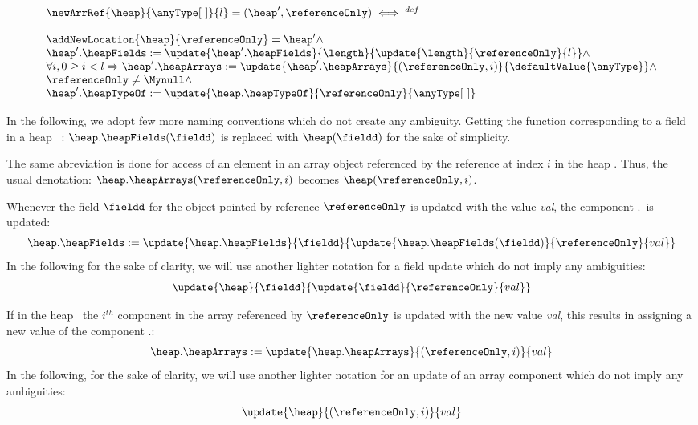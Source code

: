  $$  \begin{array}{l}
            \newArrRef{\heap}{\anyType\lbrack \ \rbrack}{l} = (\heap', \referenceOnly)      \iff^{def} \\
	    \\
	    \addNewLocation{\heap}{\referenceOnly} = \heap' \wedge \\
            \heap'.\heapFields :=  \update{\heap'.\heapFields}{\length}{\update{\length}{ \referenceOnly}{ l }} \wedge  \\
	    \forall i, 0 \geq i < l  \Rightarrow   \heap'.\heapArrays :=
            \update{\heap'.\heapArrays}{(\referenceOnly , i)}{ \defaultValue{\anyType }  } \wedge \\ 
	    \referenceOnly \neq \Mynull \wedge \\ 
	    \heap'.\heapTypeOf :=  \update{ \heap.\heapTypeOf}{ \referenceOnly}{\anyType\lbrack \ \rbrack  }    
     \end{array} $$



In the following, we adopt few more naming conventions which do not create any ambiguity.
 Getting the function corresponding to a field \fieldd in a heap \heap \ :
$ \heap . \heapFields ( \fieldd)$ is replaced  with $ \heap  ( \fieldd)$ for the sake of simplicity.
 
The same abreviation is done for access of an element in an  array object referenced by the reference 
  at index $i$ in the heap \heap. Thus, the usual denotation:
$ \heap . \heapArrays (\referenceOnly, i )$ becomes $ \heap(\referenceOnly, i )$.
 
 




 
   Whenever the  field $\fieldd$ for the object pointed by reference
 $\referenceOnly$ is updated  with the value \textit{val},
 the component \heap.\heapFields \ is updated:
 $$ \heap.\heapFields := \update{\heap.\heapFields}{\fieldd}{\update{\heap.\heapFields(\fieldd)}{\referenceOnly}{val}} $$  
 In the following for the sake of clarity, we will use another lighter notation for a field update which do not imply any ambiguities:
 $$ 
  \update{\heap}{\fieldd}{\update{\fieldd}{\referenceOnly}{val}} 
 $$ 



 If in the heap \heap \ 
 the $i^{th}$ component in the array referenced by $\referenceOnly$ is updated with the new value \textit{val},
 this results in assigning a new value of the component \heap.\heapArrays:
 $$\heap.\heapArrays := \update{\heap.\heapArrays}{(\referenceOnly , i)}{val} $$ 
 In the following, for the sake of clarity, we will use another lighter notation for an update of an array component
 which do not imply any ambiguities:
 $$ 
  \update{\heap}{(\referenceOnly , i) }{val} 
 $$ 

 
 


